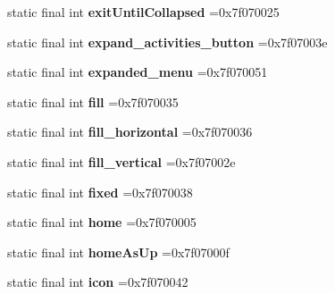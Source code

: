 \begin{DoxyCompactItemize}
\mbox{\label{classproject4_1_1xaria_1_1R_1_1id_a79cb4c537e290bb944d45885e143bd7b}} 
static final int {\bfseries exit\+Until\+Collapsed} =0x7f070025
\item 
\mbox{\label{classproject4_1_1xaria_1_1R_1_1id_accfe3963c845776fa1944f4763f2c1ba}} 
static final int {\bfseries expand\+\_\+activities\+\_\+button} =0x7f07003e
\item 
\mbox{\label{classproject4_1_1xaria_1_1R_1_1id_aed9c54d50777ae39a99fa1bcfdaabc34}} 
static final int {\bfseries expanded\+\_\+menu} =0x7f070051
\item 
\mbox{\label{classproject4_1_1xaria_1_1R_1_1id_a3dbeba89cd0151a34e3b94627fd59ed4}} 
static final int {\bfseries fill} =0x7f070035
\item 
\mbox{\label{classproject4_1_1xaria_1_1R_1_1id_a8e42eee32294bfb1320847b6853edfd1}} 
static final int {\bfseries fill\+\_\+horizontal} =0x7f070036
\item 
\mbox{\label{classproject4_1_1xaria_1_1R_1_1id_aa837648fb30107d8aca6c2876436a4b3}} 
static final int {\bfseries fill\+\_\+vertical} =0x7f07002e
\item 
\mbox{\label{classproject4_1_1xaria_1_1R_1_1id_a084b09f2295cf29e1a8c3d2536d358d2}} 
static final int {\bfseries fixed} =0x7f070038
\item 
\mbox{\label{classproject4_1_1xaria_1_1R_1_1id_acbec49b7c74662852a5bde9dd879c0de}} 
static final int {\bfseries home} =0x7f070005
\item 
\mbox{\label{classproject4_1_1xaria_1_1R_1_1id_aa70b3d627d241b9bac62c15ca6cb15cb}} 
static final int {\bfseries home\+As\+Up} =0x7f07000f
\item 
\mbox{\label{classproject4_1_1xaria_1_1R_1_1id_ac6a08e63256a2993d761852501bdf150}} 
static final int {\bfseries icon} =0x7f070042

\end{DoxyCompactItemize}
